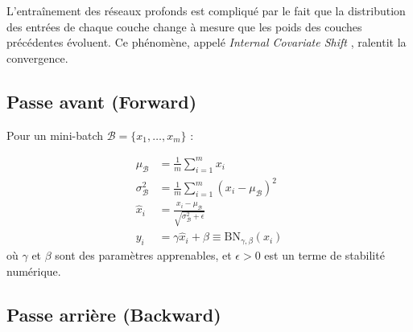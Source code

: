 L'entra\^inement des r\'eseaux profonds est compliqu\'e par le fait que la
distribution des entr\'ees de chaque couche change \`a mesure que les poids
des couches pr\'ec\'edentes \'evoluent. Ce ph\'enom\`ene, appel\'e
\textit{Internal Covariate Shift} \cite{ioffe2015batch}, ralentit la convergence.

\subsection{Passe avant (Forward)}

Pour un mini-batch $\mathcal{B} = \{x_1, \ldots, x_m\}$ :

\begin{formules}[title=\textbf{Batch Normalization -- Passe avant}]
\begin{align}
\mu_{\mathcal{B}} &= \frac{1}{m} \sum_{i=1}^m x_i
\label{eq:bn-mean} \\
\sigma_{\mathcal{B}}^2 &= \frac{1}{m} \sum_{i=1}^m (x_i - \mu_{\mathcal{B}})^2
\label{eq:bn-var} \\
\hat{x}_i &= \frac{x_i - \mu_{\mathcal{B}}}{\sqrt{\sigma_{\mathcal{B}}^2 + \epsilon}}
\label{eq:bn-norm} \\
y_i &= \gamma \hat{x}_i + \beta \equiv \text{BN}_{\gamma, \beta}(x_i)
\label{eq:bn-output}
\end{align}
o\`u $\gamma$ et $\beta$ sont des param\`etres apprenables, et
$\epsilon > 0$ est un terme de stabilit\'e num\'erique.
\end{formules}

\subsection{Passe arri\`ere (Backward)}


